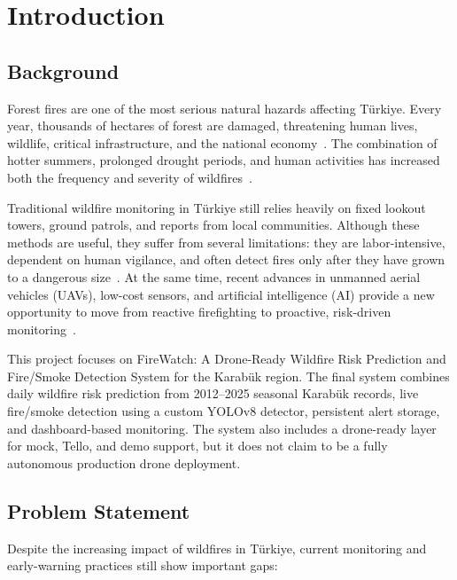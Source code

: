\chapter{Introduction}

\section{Background}

Forest fires are one of the most serious natural hazards affecting Türkiye.
Every year, thousands of hectares of forest are damaged, threatening human
lives, wildlife, critical infrastructure, and the national economy~\cite{colak2020}.
The combination of hotter summers, prolonged drought periods, and human
activities has increased both the frequency and severity of wildfires~\cite{goltas2024,ekberzade2025}.

Traditional wildfire monitoring in Türkiye still relies heavily on fixed
lookout towers, ground patrols, and reports from local communities. Although
these methods are useful, they suffer from several limitations: they are
labor-intensive, dependent on human vigilance, and often detect fires only
after they have grown to a dangerous size~\cite{bugaric2025}. At the same
time, recent advances in unmanned aerial vehicles (UAVs), low-cost sensors,
and artificial intelligence (AI) provide a new opportunity to move from
reactive firefighting to proactive, risk-driven monitoring~\cite{mohapatra2022}.

This project focuses on FireWatch: A Drone-Ready Wildfire Risk Prediction and
Fire/Smoke Detection System for the Karabük region. The final system combines
daily wildfire risk prediction from 2012--2025 seasonal Karabük records, live
fire/smoke detection using a custom YOLOv8 detector, persistent alert storage,
and dashboard-based monitoring. The system also includes a drone-ready layer
for mock, Tello, and demo support, but it does not claim to be a fully
autonomous production drone deployment.

\section{Problem Statement}

Despite the increasing impact of wildfires in Türkiye, current monitoring and
early-warning practices still show important gaps:

